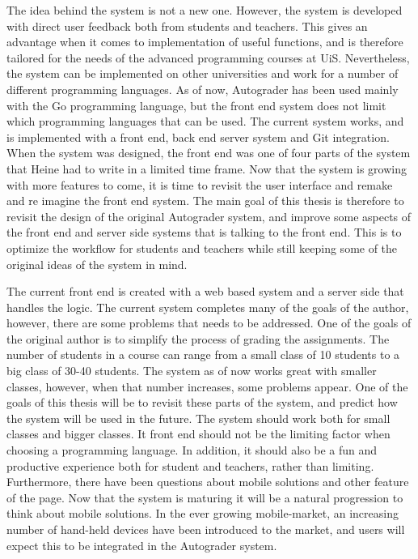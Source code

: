 The idea behind the system is not a new one. However, the system is developed with direct user feedback both from students and teachers. This gives an advantage when it comes to implementation of useful functions, and is therefore tailored for the needs of the advanced programming courses at UiS. Nevertheless, the system can be implemented on other universities and work for a number of different programming languages. As of now, Autograder has been used mainly with the Go programming language, but the front end system does not limit which programming languages that can be used. The current system works, and is implemented with a front end, back end server system and Git integration. When the system was designed, the front end was one of four parts of the system that Heine had to write in a limited time frame. Now that the system is growing with more features to come, it is time to revisit the user interface and remake and re imagine the front end system. The main goal of this thesis is therefore to revisit the design of the original Autograder system, and improve some aspects of the front end and server side systems that is talking to the front end. This is to optimize the workflow for students and teachers while still keeping some of the original ideas of the system in mind.

The current front end is created with a web based system and a server side that handles the logic. The current system completes many of the goals of the author, however, there are some problems that needs to be addressed. One of the goals of the original author is to simplify the process of grading the assignments. The number of students in a course can range from a small class of 10 students to a big class of 30-40 students. The system as of now works great with smaller classes, however, when that number increases, some problems appear. One of the goals of this thesis will be to revisit these parts of the system, and predict how the system will be used in the future. The system should work both for small classes and bigger classes. It front end should not be the limiting factor when choosing a programming language. In addition, it should also be a fun and productive experience both for student and teachers, rather than limiting. Furthermore, there have been questions about mobile solutions and other feature of the page. Now that the system is maturing it will be a natural progression to think about mobile solutions. In the ever growing mobile-market, an increasing number of hand-held devices have been introduced to the market, and users will expect this to be integrated in the Autograder system.

%